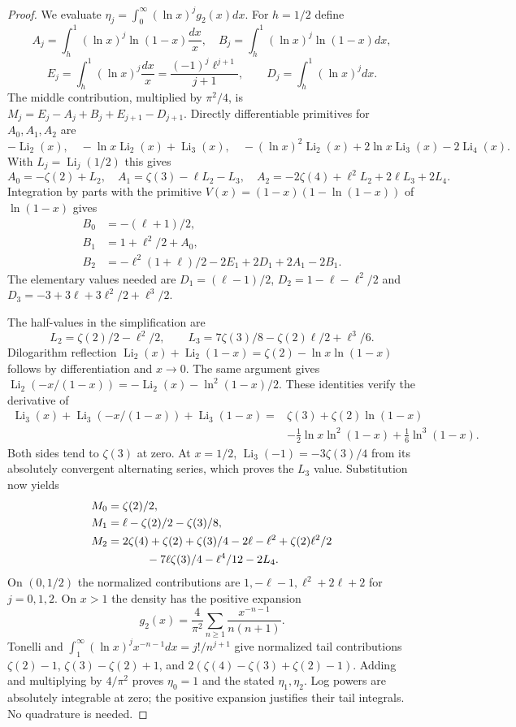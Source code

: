 \documentclass[11pt,a4paper]{article}
\numberwithin{equation}{section}
\theoremstyle{remark}
\begin{document}
\begin{proof}
We evaluate $\eta_j=\int_0^\infty(\ln x)^jg_2(x)dx$.
For $h=1/2$ define
\[
A_j=\int_h^1(\ln x)^j\ln(1-x)\frac{dx}x,\quad
B_j=\int_h^1(\ln x)^j\ln(1-x)dx,
\]
\[
E_j=\int_h^1(\ln x)^j\frac{dx}x=\frac{(-1)^j\ell^{j+1}}{j+1},
\qquad D_j=\int_h^1(\ln x)^jdx.
\]
The middle contribution, multiplied by $\pi^2/4$, is
$M_j=E_j-A_j+B_j+E_{j+1}-D_{j+1}$.
Directly differentiable primitives for $A_0,A_1,A_2$ are
\[
-\operatorname{Li}_2(x),\quad
-\ln x\operatorname{Li}_2(x)+\operatorname{Li}_3(x),\quad
-(\ln x)^2\operatorname{Li}_2(x)+2\ln x\operatorname{Li}_3(x)
-2\operatorname{Li}_4(x).
\]
With $L_j=\operatorname{Li}_j(1/2)$ this gives
\[
A_0=-\zeta(2)+L_2,\quad A_1=\zeta(3)-\ell L_2-L_3,
\quad A_2=-2\zeta(4)+\ell^2L_2+2\ell L_3+2L_4.
\]
Integration by parts with the primitive
$V(x)=(1-x)(1-\ln(1-x))$ of $\ln(1-x)$ gives
\begin{align*}
B_0&=-(\ell+1)/2,\\
B_1&=1+\ell^2/2+A_0,\\
B_2&=-\ell^2(1+\ell)/2-2E_1+2D_1+2A_1-2B_1.
\end{align*}
The elementary values needed are
$D_1=(\ell-1)/2$, $D_2=1-\ell-\ell^2/2$ and
$D_3=-3+3\ell+3\ell^2/2+\ell^3/2$.

The half-values in the simplification are
\[
L_2=\zeta(2)/2-\ell^2/2,\qquad
L_3=7\zeta(3)/8-\zeta(2)\ell/2+\ell^3/6.
\]
Dilogarithm reflection
$\operatorname{Li}_2(x)+\operatorname{Li}_2(1-x)
=\zeta(2)-\ln x\ln(1-x)$ follows by differentiation and $x\to0$.
The same argument gives
$\operatorname{Li}_2(-x/(1-x))=-\operatorname{Li}_2(x)-\ln^2(1-x)/2$.
These identities verify the derivative of
\begin{align*}
\operatorname{Li}_3(x)+\operatorname{Li}_3(-x/(1-x))
+\operatorname{Li}_3(1-x)
={}&\zeta(3)+\zeta(2)\ln(1-x)\\
&-\tfrac12\ln x\ln^2(1-x)+\tfrac16\ln^3(1-x).
\end{align*}
Both sides tend to $\zeta(3)$ at zero. At $x=1/2$,
$\operatorname{Li}_3(-1)=-3\zeta(3)/4$ from its absolutely convergent
alternating series, which proves the $L_3$ value.
Substitution now yields
\begin{align*}
M_0&=\zeta(2)/2,\\
M_1&=\ell-\zeta(2)/2-\zeta(3)/8,\\
M_2&=2\zeta(4)+\zeta(2)+\zeta(3)/4-2\ell-\ell^2
+\zeta(2)\ell^2/2\\
&\hspace{12mm}-7\ell\zeta(3)/4-\ell^4/12-2L_4.
\end{align*}
On $(0,1/2)$ the normalized contributions are
$1,-\ell-1,\ell^2+2\ell+2$ for $j=0,1,2$.
On $x>1$ the density has the positive expansion
\[
g_2(x)=\frac4{\pi^2}\sum_{n\ge1}\frac{x^{-n-1}}{n(n+1)}.
\]
Tonelli and $\int_1^\infty(\ln x)^jx^{-n-1}dx=j!/n^{j+1}$ give
normalized tail contributions $\zeta(2)-1$,
$\zeta(3)-\zeta(2)+1$, and $2(\zeta(4)-\zeta(3)+\zeta(2)-1)$.
Adding and multiplying by $4/\pi^2$ proves $\eta_0=1$ and the
stated $\eta_1,\eta_2$. Log powers are absolutely integrable at zero;
the positive expansion justifies their tail integrals. No quadrature
is needed.


\end{proof}
\end{document}
